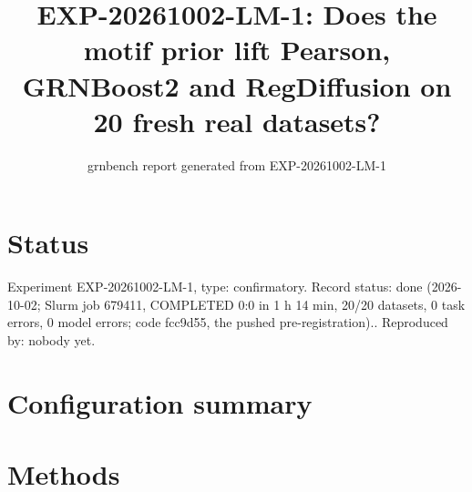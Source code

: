 \documentclass{article}
\title{EXP-20261002-LM-1: Does the motif prior lift Pearson, GRNBoost2 and RegDiffusion on 20 fresh real datasets?}
\author{grnbench report generated from EXP-20261002-LM-1}
\date{}
\begin{document}
\maketitle
\section*{Status}
Experiment EXP-20261002-LM-1, type: confirmatory. Record status: done (2026-10-02; Slurm job 679411, COMPLETED 0:0 in 1 h 14 min, 20/20 datasets, 0 task errors, 0 model errors; code fcc9d55, the pushed pre-registration).. Reproduced by: nobody yet.
\section{Configuration summary}

\section{Methods}
\end{document}
